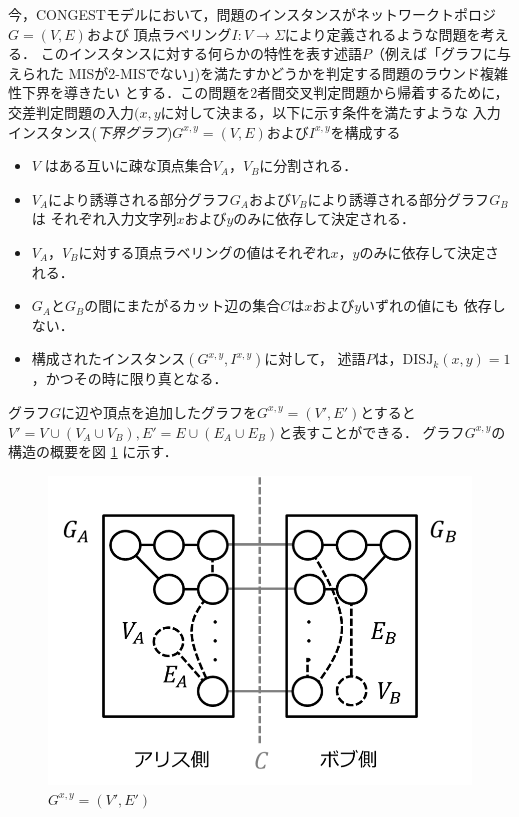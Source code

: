 \documentclass[12pt]{thesis}
\newcommand{\CONGEST}{\textsf{CONGEST}}
\theoremstyle{definition}
\begin{document}
今，{\CONGEST}モデルにおいて，問題のインスタンスがネットワークトポロジ$G = (V, E)$および
頂点ラベリング$I : V \to \Sigma$により定義されるような問題を考える．
このインスタンスに対する何らかの特性を表す述語$P$（例えば「グラフに与えられた
MISが2-MISでない」)を満たすかどうかを判定する問題のラウンド複雑性下界を導きたい
とする．この問題を2者間交叉判定問題から帰着するために，
交差判定問題の入力$(x, y$に対して決まる，以下に示す条件を満たすような
入力インスタンス(\emph{下界グラフ})$G^{x, y} = (V, E)$および$I^{x, y}$を構成する

\begin{itemize}
\item $V$ はある互いに疎な頂点集合$V_A$，$V_B$に分割される．
\item $V_A$により誘導される部分グラフ$G_A$および$V_B$により誘導される部分グラフ$G_B$は
それぞれ入力文字列$x$および$y$のみに依存して決定される．
\item $V_A$，$V_B$に対する頂点ラベリングの値はそれぞれ$x$，$y$のみに依存して決定される．
\item $G_A$と$G_B$の間にまたがるカット辺の集合$C$は$x$および$y$いずれの値にも
依存しない．
\item 構成されたインスタンス$(G^{x,y}, I^{x,y})$に対して，
述語$P$は，$\mathrm{DISJ}_{k} (x, y)=1$，かつその時に限り真となる．
\end{itemize}
グラフ$G$に辺や頂点を追加したグラフを$G^{x, y} = (V', E')$とすると
$V' = V \cup (V_{A} \cup V_{B}), E' = E \cup (E_{A} \cup E_{B})$と表すことができる．
グラフ$G^{x, y}$の構造の概要を図 \ref{Gxy} に示す．

\begin{figure}[ht]
\begin{center}
\includegraphics[width=120mm]{Gxy.png}
\end{center}
\caption{$G^{x, y} = (V', E')$}
\label{Gxy}
\end{figure}
\end{document}
